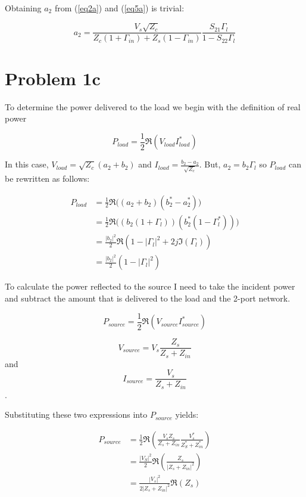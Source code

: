 Obtaining $a_2$ from (\ref{eq2a}) and (\ref{eq5a}) is trivial:

\begin{equation}
    a_2 = \frac{V_s \sqrt{Z_c}}{Z_c \left( 1+\Gamma_{in} \right) +
    Z_s(1-\Gamma_{in})}\frac{S_{21}\Gamma_l}{1-S_{22}\Gamma_l} \label{a2}
\end{equation}
\section*{Problem 1c}
To determine the power delivered to the load we begin with the definition of
real power

\[ 
        P_{load} =  \frac{1}{2}\Re\left( V_{load}I^*_{load} \right) 
\]

In this case, $V_{load} = \sqrt{Z_c} \left( a_2 + b_2 \right) $ and $I_{load} =
\frac{b_2-a_2}{\sqrt{Z_c}}$. But, $a_2 = b_2 \Gamma_l$ so $P_{load}$ can be
rewritten as follows:

\begin{align*}
    P_{load} &= \frac{1}{2}\Re\Big( \left( a_2+b_2 \right)\left( b_2^*-a_2^*
    \right)\Big) \\
    &= \frac{1}{2}\Re\Big( \left( b_2 \left( 1+\Gamma_l \right) \right)\left(
    b_2^* \left( 1-\Gamma_l^* \right) \right)\Big) \\
    &= \frac{\left| b_2 \right|^2 }{2}\Re \left( 1- \left| \Gamma_l \right|^2 + 2j
\Im(\Gamma_l) \right) \\ 
    &= \frac{\left| b_2 \right|^2 }{2} \left( 1- \left| \Gamma_l \right|^2 \right)
\end{align*}

To calculate the power reflected to the source I need to take the incident power
and subtract the amount that is delivered to the load and the 2-port network.

\[ 
        P_{source} = \frac{1}{2}\Re \left( V_{source}I^*_{source} \right) 
\]

$$V_{source} = V_s \frac{Z_s}{Z_s+Z_{in}}$$ and $$I_{source} =\frac{V_s}{Z_s +
Z_{in}}$$.

Substituting these two expressions into $P_{source}$ yields:

\begin{align*}
    P_{source} &= \frac{1}{2} \Re \left( \frac{V_s Z_s}{Z_s + Z_{in}}
\frac{V_s^*}{Z_S^* + Z_{in}^*} \right) \\
&= \frac{\left| V_S \right|^2}{2} \Re \left( \frac{Z_s}{|Z_s+Z_{in}|^2} \right)
\\
&= \frac{\left| V_s \right|^2}{2 \left| Z_s + Z_{in} \right|^2} \Re(Z_s)
\end{align*}

